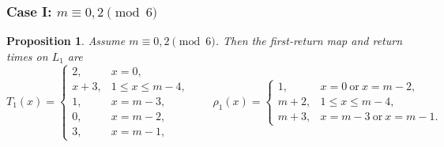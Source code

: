 \documentclass[11pt]{article}
\newtheorem{proposition}{Proposition}
\begin{document}
\subsubsection{Case I: $m\equiv 0,2\pmod 6$}

\begin{proposition}\label{prop:R1-caseI}
Assume $m\equiv 0,2\pmod 6$.
Then the first-return map and return times on $L_1$ are
\[
T_1(x)=
\begin{cases}
2,&x=0,\\
x+3,&1\le x\le m-4,\\
1,&x=m-3,\\
0,&x=m-2,\\
3,&x=m-1,
\end{cases}
\qquad
\rho_1(x)=
\begin{cases}
1,&x=0\ \text{or}\ x=m-2,\\
m+2,&1\le x\le m-4,\\
m+3,&x=m-3\ \text{or}\ x=m-1.
\end{cases}
\]
\end{proposition}
\end{document}
